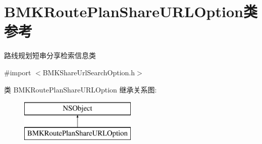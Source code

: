 \hypertarget{interface_b_m_k_route_plan_share_u_r_l_option}{}\section{B\+M\+K\+Route\+Plan\+Share\+U\+R\+L\+Option类 参考}
\label{interface_b_m_k_route_plan_share_u_r_l_option}


路线规划短串分享检索信息类  




{\ttfamily \#import $<$B\+M\+K\+Share\+Url\+Search\+Option.\+h$>$}

类 B\+M\+K\+Route\+Plan\+Share\+U\+R\+L\+Option 继承关系图\+:\begin{figure}[H]
\begin{center}
\leavevmode
\includegraphics[height=2.000000cm]{interface_b_m_k_route_plan_share_u_r_l_option}
\end{center}
\end{figure}
